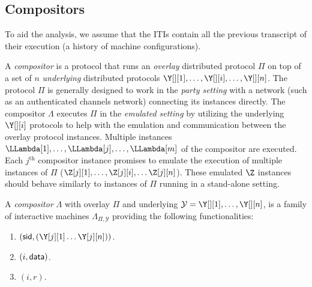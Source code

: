 \subsection{Compositors}

To aid the analysis, we assume that the ITIs contain all the previous transcript
of their execution (a history of machine configurations).

%


A \emph{compositor} is a protocol that
runs an \emph{overlay} distributed protocol $\Pi$ on top of a set of
$n$ \emph{underlying} distributed protocols $\Y[][1], \ldots, \Y[][i], \ldots, \Y[][n]$.
The protocol $\Pi$ is generally designed
to work in the \emph{party setting} with a network (such as an authenticated channels network)
connecting its instances directly.
The compositor $\Lambda$ executes
$\Pi$ in the \emph{emulated setting} by utilizing the underlying
$\Y[][i]$ protocols to help with the emulation and communication between the
overlay protocol instances.
Multiple instances $\LLambda[1], \ldots, \LLambda[j], \ldots, \LLambda[m]$
of the compositor are executed.
Each $j^\text{th}$ compositor instance promises to emulate the execution of multiple
instances of $\Pi$ ($\Z[j][1], \ldots, \Z[j][i], \ldots \Z[j][n]$).
These emulated $\Z$ instances should behave similarly to instances of $\Pi$
running in a stand-alone setting.

\begin{definition}[Compositor]
  A \emph{compositor} $\Lambda$ with overlay $\Pi$ and underlying $\mathcal{Y} = \Y[][1], \ldots, \Y[][n]$,
  is a family of interactive machines
  $\Lambda_{\Pi,\mathcal{Y}}$ providing the following
  functionalities:

  \begin{enumerate}
    \item \construct$(\sid, (\Y[j][1] \ldots \Y[j][n]))$.
    \item \writeToMachine$(i, \textsf{data})$.
    \item \emulateMachine$(i, r)$. %
  \end{enumerate}
\end{definition}

